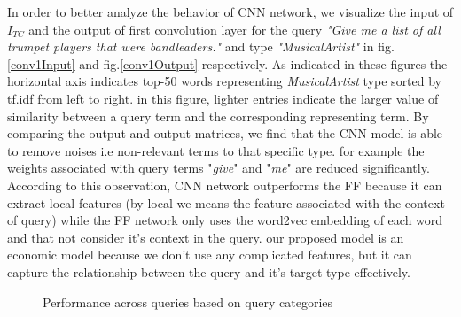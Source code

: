 In order to better analyze the behavior of CNN network, we visualize the input of $I_{TC}$ and the output of first convolution layer for the query \textit{"Give me a list of all trumpet players that were bandleaders."} and type \textit{"MusicalArtist"} in fig.\ref{conv1Input} and fig.\ref{conv1Output} respectively. As indicated in these figures the horizontal axis indicates top-50 words representing \textit{MusicalArtist} type sorted by tf.idf from left to right. in this figure, lighter entries indicate the larger value of similarity between a query term and the corresponding representing term. By comparing the output and output matrices, we find that the CNN model is able to remove noises i.e non-relevant terms to that specific type. for example the weights associated with query terms "\textit{give}" and "\textit{me}" are reduced significantly. According to this observation, CNN network outperforms the FF because it can extract local features (by local we means the feature associated with the context of query) while the FF network only uses the word2vec embedding of each word and that not consider it's context in the query. our proposed model is an economic model because we don't use any complicated features, but it can capture the relationship between the query and it's target type effectively.     





\begin{figure}
	
	\caption{Performance across queries based on query categories}

\end{figure}

